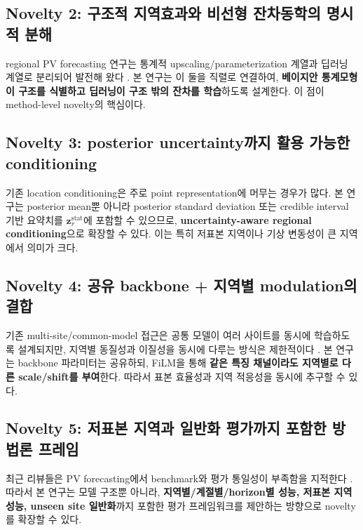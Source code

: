 \documentclass[11pt,a4paper]{article}
\begin{document}
\subsection{Novelty 2: 구조적 지역효과와 비선형 잔차동학의 명시적 분해}
regional PV forecasting 연구는 통계적 upscaling/parameterization 계열과 딥러닝 계열로 분리되어 발전해 왔다 \citep{SaintDrenan2019Bayesian,Jung2022VAR,Perera2024HTCNN}. 본 연구는 이 둘을 직렬로 연결하여, \textbf{베이지안 통계모형이 구조를 식별하고 딥러닝이 구조 밖의 잔차를 학습}하도록 설계한다. 이 점이 method-level novelty의 핵심이다.

\subsection{Novelty 3: posterior uncertainty까지 활용 가능한 conditioning}
기존 location conditioning은 주로 point representation에 머무는 경우가 많다. 본 연구는 posterior mean뿐 아니라 posterior standard deviation 또는 credible interval 기반 요약치를 $\bm z_r^{\mathrm{stat}}$에 포함할 수 있으므로, \textbf{uncertainty-aware regional conditioning}으로 확장할 수 있다. 이는 특히 저표본 지역이나 기상 변동성이 큰 지역에서 의미가 크다.

\subsection{Novelty 4: 공유 backbone + 지역별 modulation의 결합}
기존 multi-site/common-model 접근은 공통 모델이 여러 사이트를 동시에 학습하도록 설계되지만, 지역별 동질성과 이질성을 동시에 다루는 방식은 제한적이다 \citep{Jang2024CommonModel}. 본 연구는 backbone 파라미터는 공유하되, FiLM을 통해 \textbf{같은 특징 채널이라도 지역별로 다른 scale/shift를 부여}한다. 따라서 표본 효율성과 지역 적응성을 동시에 추구할 수 있다.

\subsection{Novelty 5: 저표본 지역과 일반화 평가까지 포함한 방법론 프레임}
최근 리뷰들은 PV forecasting에서 benchmark와 평가 통일성이 부족함을 지적한다 \citep{Iheanetu2022Review}. 따라서 본 연구는 모델 구조뿐 아니라, \textbf{지역별/계절별/horizon별 성능, 저표본 지역 성능, unseen site 일반화}까지 포함한 평가 프레임워크를 제안하는 방향으로 novelty를 확장할 수 있다.
\end{document}
